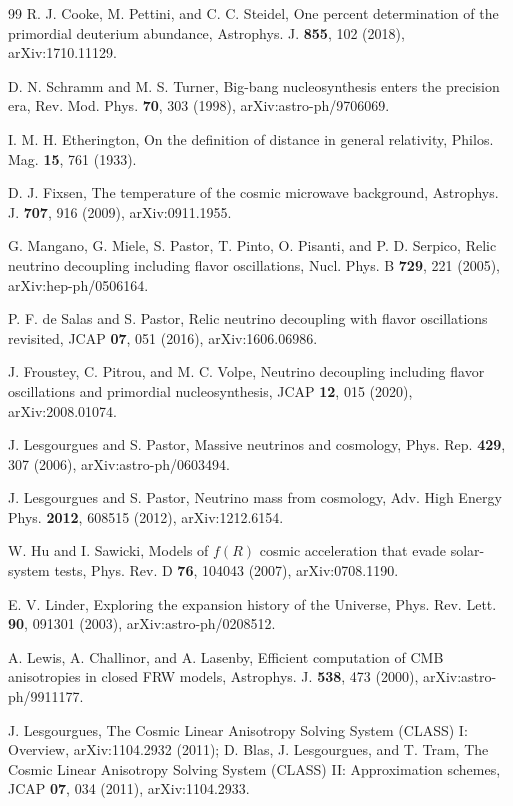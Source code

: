 \documentclass[
  aps,
  prd,
  reprint,
  superscriptaddress,
  nofootinbib,
  floatfix,
  longbibliography
]{revtex4-2}
\theoremstyle{plain}
\theoremstyle{definition}
\theoremstyle{remark}
\begin{document}
\begin{thebibliography}{99}
R. J. Cooke, M. Pettini, and C. C. Steidel, One percent determination of the primordial
deuterium abundance, Astrophys. J. \textbf{855}, 102 (2018), arXiv:1710.11129.

D. N. Schramm and M. S. Turner, Big-bang nucleosynthesis enters the precision era,
Rev. Mod. Phys. \textbf{70}, 303 (1998), arXiv:astro-ph/9706069.

I. M. H. Etherington, On the definition of distance in general relativity,
Philos. Mag. \textbf{15}, 761 (1933).

D. J. Fixsen, The temperature of the cosmic microwave background, Astrophys. J.
\textbf{707}, 916 (2009), arXiv:0911.1955.

G. Mangano, G. Miele, S. Pastor, T. Pinto, O. Pisanti, and P. D. Serpico,
Relic neutrino decoupling including flavor oscillations, Nucl. Phys. B \textbf{729},
221 (2005), arXiv:hep-ph/0506164.

P. F. de Salas and S. Pastor, Relic neutrino decoupling with flavor oscillations
revisited, JCAP \textbf{07}, 051 (2016), arXiv:1606.06986.

J. Froustey, C. Pitrou, and M. C. Volpe, Neutrino decoupling including flavor
oscillations and primordial nucleosynthesis, JCAP \textbf{12}, 015 (2020),
arXiv:2008.01074.

J. Lesgourgues and S. Pastor, Massive neutrinos and cosmology, Phys. Rep. \textbf{429},
307 (2006), arXiv:astro-ph/0603494.

J. Lesgourgues and S. Pastor, Neutrino mass from cosmology, Adv. High Energy Phys.
\textbf{2012}, 608515 (2012), arXiv:1212.6154.

W. Hu and I. Sawicki, Models of $f(R)$ cosmic acceleration that evade solar-system tests,
Phys. Rev. D \textbf{76}, 104043 (2007), arXiv:0708.1190.

E. V. Linder, Exploring the expansion history of the Universe, Phys. Rev. Lett.
\textbf{90}, 091301 (2003), arXiv:astro-ph/0208512.

A. Lewis, A. Challinor, and A. Lasenby, Efficient computation of CMB anisotropies in
closed FRW models, Astrophys. J. \textbf{538}, 473 (2000),
arXiv:astro-ph/9911177.

J. Lesgourgues, The Cosmic Linear Anisotropy Solving System (CLASS) I:
Overview, arXiv:1104.2932 (2011); D. Blas, J. Lesgourgues, and T. Tram,
The Cosmic Linear Anisotropy Solving System (CLASS) II: Approximation schemes,
JCAP \textbf{07}, 034 (2011), arXiv:1104.2933.

\end{thebibliography}
\end{document}
